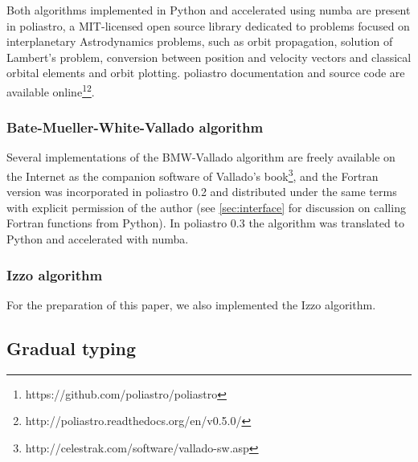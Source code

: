 
Both algorithms implemented in Python and accelerated using numba are present in poliastro, a MIT-licensed open source library dedicated to problems focused on interplanetary Astrodynamics problems, such as orbit propagation, solution of Lambert's problem, conversion between position and velocity vectors and classical orbital elements and orbit plotting. poliastro documentation and source code are available online\footnote{https://github.com/poliastro/poliastro}\footnote{http://poliastro.readthedocs.org/en/v0.5.0/}.

\subsubsection{Bate-Mueller-White-Vallado algorithm}

Several implementations of the BMW-Vallado algorithm are freely available on the Internet as the companion software of Vallado's book\footnote{http://celestrak.com/software/vallado-sw.asp}, and the Fortran version was incorporated in poliastro 0.2 and distributed under the same terms with explicit permission of the author (see \ref{sec:interface} for discussion on calling Fortran functions from Python). In poliastro 0.3 the algorithm was translated to Python and accelerated with numba.


\subsubsection{Izzo algorithm}

For the preparation of this paper, we also implemented the Izzo algorithm.

\subsection{Gradual typing}